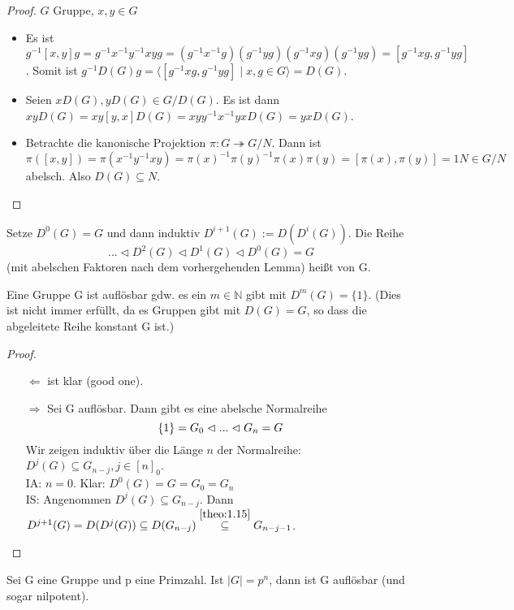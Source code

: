 \documentclass[../main.tex]{subfiles}
\begin{document}
\begin{proof}
$G$ Gruppe, $x, y \in G$
\begin{itemize}
    \item Es ist $g^{-1}[x,y]g = g^{-1}x^{-1}y^{-1}xyg = (g^{-1}x^{-1}g)(g^{-1}yg)(g^{-1}xg)(g^{-1}yg) = [g^{-1}xg, g^{-1}yg]$. Somit ist $g^{-1}D(G)g = \langle[g^{-1}xg, g^{-1}yg] \mid x,g \in G\rangle = D(G)$.
    
    \item Seien $xD(G), yD(G) \in G/D(G)$. Es ist dann $xyD(G) = xy[y,x]D(G) = xyy^{-1}x^{-1}yxD(G) = yxD(G)$. 
    
    \item Betrachte die kanonische Projektion $\pi: G \twoheadrightarrow G/N$. Dann ist $\pi([x,y]) = \pi(x^{-1}y^{-1}xy) = \pi(x)^{-1}\pi(y)^{-1}\pi(x)\pi(y) = [\pi(x), \pi(y)] = 1N \in G/N$ abelsch.
    Also $D(G) \subseteq N$.
\end{itemize}
\end{proof}
\begin{definition}
    Setze $D^0(G) = G$ und dann induktiv $D^{i+1}(G) := D(D^i(G))$. Die Reihe 
    $$... \triangleleft D^2(G) \triangleleft D^1(G) \triangleleft D^0(G) = G$$
    (mit abelschen Faktoren nach dem vorhergehenden Lemma) heißt  von G.
\end{definition}
\begin{theorem}
    Eine Gruppe G ist auflösbar gdw. es ein $m \in \mathbb{N}$ gibt mit $D^m(G) = \{1\}$. (Dies ist nicht immer erfüllt, da es Gruppen gibt mit $D(G) = G$, so dass die abgeleitete Reihe konstant G ist.)
\end{theorem}
\begin{proof}$ $
    \begin{itemize}
        \item[$\Leftarrow$] ist klar (good one).
        \item[$\Rightarrow$]
        Sei G auflösbar. Dann gibt es eine abelsche Normalreihe
        $$\{1\} = G_0 \vartriangleleft ... \vartriangleleft G_n = G$$
        Wir zeigen induktiv über die Länge $n$ der Normalreihe: $D^j(G) \subseteq G_{n-j}, j \in [n]_0$.\\
        IA: $n=0$. Klar: $D^0(G) = G = G_0 = G_n$\\
        IS: Angenommen $D^j(G) \subseteq G_{n-j}$. Dann $D^{j+1}(G) = D(D^j(G)) \subseteq D(G_{n-j}) \overset{\ref{theo:1.15}}{\subseteq} G_{n-j-1}$.
    \end{itemize}
\end{proof}
\begin{example}
    Sei G eine Gruppe und p eine Primzahl. Ist $|G| = p^n$, dann ist G auflösbar (und sogar nilpotent).
\end{example}
\end{document}
